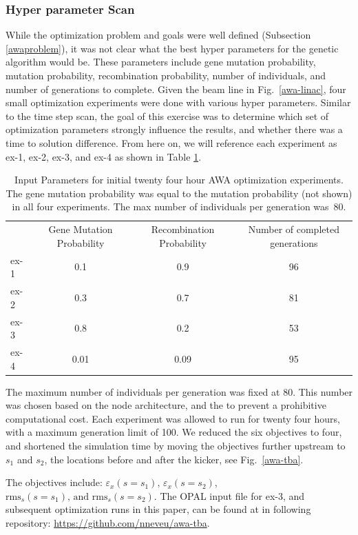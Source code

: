 \subsubsection{Hyper parameter Scan}
While the optimization problem and goals were well defined (Subsection \ref{awaproblem}), 
it was not clear what the best hyper parameters for the genetic algorithm would be.
These parameters include gene mutation probability, mutation probability, 
recombination probability, number of individuals, 
and number of generations to complete. 
Given the beam line in Fig.~\ref{awa-linac},
four small optimization experiments were done with various hyper parameters. 
Similar to the time step scan, 
the goal of this exercise was to determine which set of optimization
parameters strongly influence the results, 
and whether there was a time to solution difference.
From here on, we will reference each experiment as ex-1, ex-2, ex-3, and ex-4
as shown in Table \ref{extable}. 
\begin{table}%
	\begin{center}
		\caption{Input Parameters for initial twenty four hour AWA optimization experiments. 
			The gene mutation probability was equal to the mutation probability (not shown) in all four experiments. 
			The max number of individuals per generation was~80.}
		\label{extable}
		\begin{tabular*}{0.48\textwidth}{l ccc}
			& Gene Mutation Probability & Recombination Probability & Number of completed generations \\
			ex-1 &  0.1  & 0.9  &  96 \\
			ex-2 &  0.3  & 0.7  &  81 \\
			ex-3 &  0.8  & 0.2  &  53 \\
			ex-4 &  0.01 & 0.09 &  95 \\
		\end{tabular*}
	\end{center}
\end{table}


The maximum number of individuals per generation was fixed at 80. 
This number was chosen based on the node architecture, and the 
to prevent a prohibitive computational cost.  
Each experiment was allowed to run for twenty four hours, with 
a maximum generation limit of 100. 
We reduced the six objectives to four, 
and shortened the simulation time by moving the objectives further 
upstream to $s_1$ and $s_2$, the locations before and after the kicker, 
see Fig.~\ref{awa-tba}.  


The objectives include: $\varepsilon_{x}\left(s = s_1\right)\text{, } \varepsilon_{x}\left(s = s_2\right)$, $\text{rms}_{s}\left(s = s_1\right)\text{, and }  \text{rms}_{s}\left(s = s_2\right)$. 
The OPAL input file for ex-3, and subsequent optimization runs in this paper, can be found at in following repository: 
\url{https://github.com/nneveu/awa-tba}.

